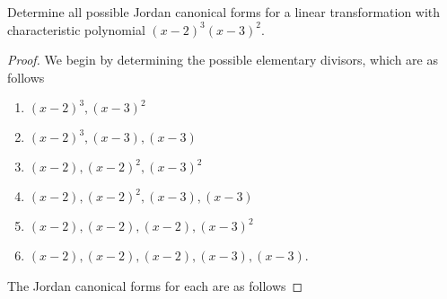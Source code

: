 \documentclass[10pt]{amsart}
\begin{document}
\begin{thm}
  \label{Ex6}
  Determine all possible Jordan canonical forms for a linear transformation with characteristic polynomial $(x-2)^3(x-3)^2$.
  \begin{proof}
    We begin by determining the possible elementary divisors, which are as follows
    \begin{enumerate}
    \item
      $(x-2)^3, (x-3)^2$
    \item
      $(x-2)^3, (x-3), (x-3)$
    \item
      $(x-2), (x-2)^2, (x-3)^2$
    \item
      $(x-2), (x-2)^2, (x-3), (x-3)$
    \item
      $(x-2), (x-2), (x-2), (x-3)^2$
    \item
      $(x-2), (x-2), (x-2), (x-3), (x-3)$.
    \end{enumerate}
    The Jordan canonical forms for each are as follows
\end{proof}
\end{thm}
\end{document}
